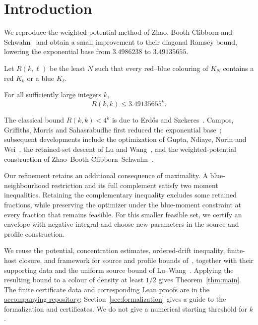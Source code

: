 \section{Introduction}
\label{sec:introduction}

We reproduce the weighted-potential method of Zhao, Booth-Clibborn and
Schwahn~\cite{ZBS} and obtain a small improvement to their diagonal
Ramsey bound, lowering the exponential base from $3.4986238$ to
$3.49135655$.

Let $R(k,\ell)$ be the least $N$ such that every red--blue colouring of
$K_N$ contains a red $K_k$ or a blue $K_\ell$.

\begin{theorem}\label{thm:main}
For all sufficiently large integers $k$,
\[
 R(k,k)\le 3.49135655^k.
\]
\end{theorem}

The classical bound $R(k,k)<4^k$ is due to Erd\H{o}s and
Szekeres~\cite{ES}. Campos, Griffiths, Morris and Sahasrabudhe first
reduced the exponential base~\cite{CGMS}; subsequent developments include
the optimization of Gupta, Ndiaye, Norin and Wei~\cite{GNNW}, the
retained-set descent of Lu and Wang~\cite{LW}, and the weighted-potential
construction of Zhao--Booth-Clibborn--Schwahn~\cite[Theorem~1.1]{ZBS}.

Our refinement retains an additional consequence of maximality. A
blue-neighbourhood restriction and its full complement satisfy two
moment inequalities. Retaining the complementary inequality excludes
some retained fractions, while preserving the optimizer under the blue-moment
constraint at every fraction that remains feasible. For this smaller feasible
set, we certify an envelope with negative integral and choose new parameters
in the source and profile construction.

We reuse the potential, concentration estimates, ordered-drift inequality,
finite-host closure, and framework for source and profile bounds
of~\cite[Sections~3--5]{ZBS}, together with
their supporting data and the uniform source bound of
Lu--Wang~\cite[Lemma~B.1]{LW}. Applying the resulting bound to a colour
of density at least $1/2$ gives Theorem~\ref{thm:main}.
The finite certificate data and corresponding Lean proofs are in the
\href{\leanrepo}{accompanying repository};
Section~\ref{sec:formalization} gives a guide to the formalization and certificates.
We do not give a numerical starting threshold for $k$.

